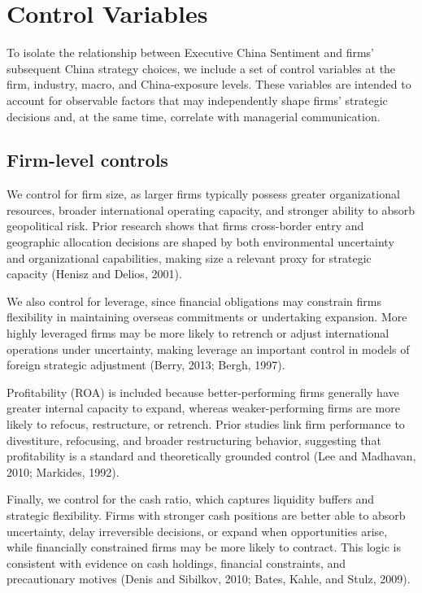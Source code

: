 \documentclass{article}
\begin{document}
\section{Control Variables}\label{control-variables}

To isolate the relationship between Executive China Sentiment and firms'
subsequent China strategy choices, we include a set of control variables
at the firm, industry, macro, and China-exposure levels. These variables
are intended to account for observable factors that may independently
shape firms' strategic decisions and, at the same time, correlate with
managerial communication.

\subsection{Firm-level controls}\label{firm-level-controls}

We control for firm size, as larger firms typically possess greater
organizational resources, broader international operating capacity, and
stronger ability to absorb geopolitical risk. Prior research shows that
firms\textquotesingle{} cross-border entry and geographic allocation
decisions are shaped by both environmental uncertainty and
organizational capabilities, making size a relevant proxy for strategic
capacity (Henisz and Delios, 2001).

We also control for leverage, since financial obligations may constrain
firms\textquotesingle{} flexibility in maintaining overseas commitments
or undertaking expansion. More highly leveraged firms may be more likely
to retrench or adjust international operations under uncertainty, making
leverage an important control in models of foreign strategic adjustment
(Berry, 2013; Bergh, 1997).

Profitability (ROA) is included because better-performing firms
generally have greater internal capacity to expand, whereas
weaker-performing firms are more likely to refocus, restructure, or
retrench. Prior studies link firm performance to divestiture,
refocusing, and broader restructuring behavior, suggesting that
profitability is a standard and theoretically grounded control (Lee and
Madhavan, 2010; Markides, 1992).

Finally, we control for the cash ratio, which captures liquidity buffers
and strategic flexibility. Firms with stronger cash positions are better
able to absorb uncertainty, delay irreversible decisions, or expand when
opportunities arise, while financially constrained firms may be more
likely to contract. This logic is consistent with evidence on cash
holdings, financial constraints, and precautionary motives (Denis and
Sibilkov, 2010; Bates, Kahle, and Stulz, 2009).
\end{document}
